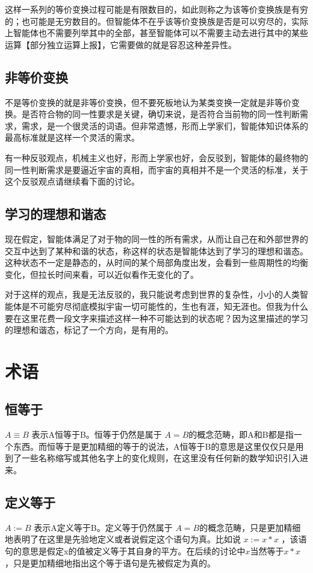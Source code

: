 \documentclass[12pt,oneside]{book}
\begin{document}
这样一系列的等价变换过程可能是有限数目的，如此则称之为该等价变换族是有穷的；也可能是无穷数目的。但智能体不在乎该等价变换族是否是可以穷尽的，实际上智能体也不需要列举其中的全部，甚至智能体可以不需要主动去进行其中的某些运算【部分独立运算上报】，它需要做的就是容忍这种差异性。


\section{非等价变换}
不是等价变换的就是非等价变换，但不要死板地认为某类变换一定就是非等价变换。是否符合物的同一性要求是关键，确切来说，是否符合当前物的同一性判断需求，需求，是一个很灵活的词语。但非常遗憾，形而上学家们，智能体知识体系的最高标准就是这样一个灵活的需求。

有一种反驳观点，机械主义也好，形而上学家也好，会反驳到，智能体的最终物的同一性判断需求是要逼近宇宙的真相，而宇宙的真相并不是一个灵活的标准，关于这个反驳观点请继续看下面的讨论。

\section{学习的理想和谐态}
现在假定，智能体满足了对于物的同一性的所有需求，从而让自己在和外部世界的交互中达到了某种和谐的状态，称这样的状态是智能体达到了学习的理想和谐态。这种状态不一定是静态的，从时间的某个局部角度出发，会看到一些周期性的均衡变化，但拉长时间来看，可以近似看作无变化的了。

对于这样的观点，我是无法反驳的，我只能说考虑到世界的复杂性，小小的人类智能体是不可能穷尽彻底模拟宇宙一切可能性的，生也有涯，知无涯也。但我为什么要在这里花费一段文字来描述这样一种不可能达到的状态呢？因为这里描述的学习的理想和谐态，标记了一个方向，是有用的。





\chapter{术语}
\section{恒等于}
$A \equiv B$ 表示A恒等于B。恒等于仍然是属于 $A=B$的概念范畴，即A和B都是指一个东西。而恒等于是更加精细的等于的说法，A恒等于B的意思是这里仅仅只是用到了一些名称缩写或其他名字上的变化规则，在这里没有任何新的数学知识引入进来。

\section{定义等于}
$A := B$ 表示A定义等于B。定义等于仍然属于 $A=B$的概念范畴，只是更加精细地表明了在这里是先验地定义或者说假定这个语句为真。比如说 $x := x*x$ ，该语句的意思是假定x的值被定义等于其自身的平方。在后续的讨论中$x$当然等于$x*x$，只是更加精细地指出这个等于语句是先被假定为真的。
\end{document}
